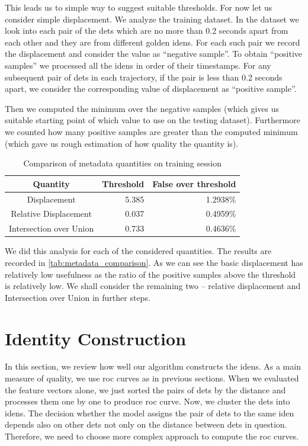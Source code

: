 This leads us to simple way to suggest suitable thresholds. For now let us consider simple displacement. We analyze the training dataset. In the dataset we look into each pair of the \glspl{det} which are no more than 0.2 seconds apart from each other and they are from different golden \glspl{iden}. For each such pair we record the displacement and consider the value as ``negative sample''. To obtain ``positive samples'' we processed all the \glspl{iden} in order of their timestamps. For any subsequent pair of \glspl{det} in each trajectory, if the pair is less than 0.2 seconds apart, we consider the corresponding value of displacement as ``positive sample''.

Then we computed the minimum over the negative samples (which gives us suitable starting point of which value to use on the testing dataset). Furthermore we counted how many positive samples are greater than the computed minimum (which gave us rough estimation of how quality the quantity is).

\begin{table}
    \centering
    \begin{tabular}{c|r|r}
         Quantity & Threshold & False over threshold  \\ \hline
         Displacement & 5.385 & 1.2938\% \\
         Relative Displacement & 0.037 & 0.4959\% \\
         Intersection over Union & 0.733 & 0.4636\%
    \end{tabular}
    \caption{Comparison of metadata quantities on training session}
    \label{tab:metadata_comparison}
\end{table}

We did this analysis for each of the considered quantities. The results are recorded in \autoref{tab:metadata_comparison}. As we can see the basic displacement has relatively low usefulness as the ratio of the positive samples above the threshold is relatively low. We shall consider the remaining two -- relative displacement and Intersection over Union in further steps.

\section{Identity Construction}

In this section, we review how well our algorithm constructs the \glspl{iden}. As a main measure of quality, we use \gls{roc} curves as in previous sections. When we evaluated the feature vectors alone, we just sorted the pairs of \glspl{det} by the distance and processes them one by one to produce \gls{roc} curve. Now, we cluster the \glspl{det} into \glspl{iden}. The decision whether the model assigns the pair of \glspl{det} to the same \gls{iden} depends also on other \glspl{det} not only on the distance between \glspl{det} in question. Therefore, we need to choose more complex approach to compute the \gls{roc} curves.

